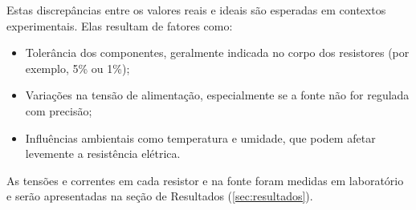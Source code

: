 Estas discrepâncias entre os valores reais e ideais são esperadas em contextos
experimentais. Elas resultam de fatores como:

\begin{itemize}
  \item Tolerância dos componentes, geralmente indicada no corpo dos resistores
  (por exemplo, 5\% ou 1\%);
  \item Variações na tensão de alimentação, especialmente se a fonte não for
  regulada com precisão;
  \item Influências ambientais como temperatura e umidade, que podem afetar
  levemente a resistência elétrica.
\end{itemize}

As tensões e correntes em cada resistor e na fonte foram medidas em laboratório e serão apresentadas na seção de Resultados (\ref{sec:resultados}).